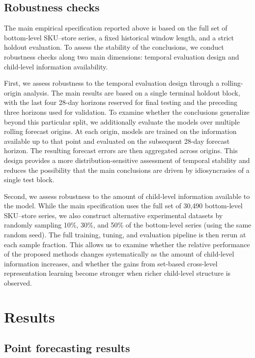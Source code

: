 \documentclass[12pt]{article}
\begin{document}
\subsection{Robustness checks}

The main empirical specification reported above is based on the full set of bottom-level SKU--store series, a fixed historical window length, and a strict holdout evaluation. To assess the stability of the conclusions, we conduct robustness checks along two main dimensions: temporal evaluation design and child-level information availability.

First, we assess robustness to the temporal evaluation design through a rolling-origin analysis. The main results are based on a single terminal holdout block, with the last four 28-day horizons reserved for final testing and the preceding three horizons used for validation. To examine whether the conclusions generalize beyond this particular split, we additionally evaluate the models over multiple rolling forecast origins. At each origin, models are trained on the information available up to that point and evaluated on the subsequent 28-day forecast horizon. The resulting forecast errors are then aggregated across origins. This design provides a more distribution-sensitive assessment of temporal stability and reduces the possibility that the main conclusions are driven by idiosyncrasies of a single test block.

Second, we assess robustness to the amount of child-level information available to the model. While the main specification uses the full set of 30,490 bottom-level SKU--store series, we also construct alternative experimental datasets by randomly sampling 10\%, 30\%, and 50\% of the bottom-level series (using the same random seed). The full training, tuning, and evaluation pipeline is then rerun at each sample fraction. This allows us to examine whether the relative performance of the proposed methods changes systematically as the amount of child-level information increases, and whether the gains from set-based cross-level representation learning become stronger when richer child-level structure is observed.

\section{Results}
\label{sec:results}

\subsection{Point forecasting results}
\end{document}
